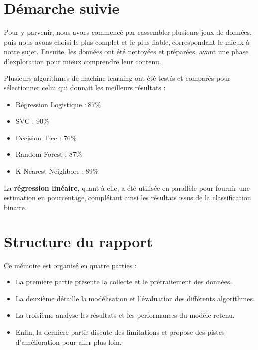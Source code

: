 \section{Démarche suivie}

Pour y parvenir, nous avons commencé par rassembler plusieurs jeux de données, puis nous avons choisi le plus complet et le plus fiable, correspondant le mieux à notre sujet. Ensuite, les données ont été nettoyées et préparées, avant une phase d’exploration pour mieux comprendre leur contenu.  

Plusieurs algorithmes de machine learning ont été testés et comparés pour sélectionner celui qui donnait les meilleurs résultats :  
\begin{itemize}
	\item Régression Logistique : 87\%  
	\item SVC : 90\%  
	\item Decision Tree : 76\%  
	\item Random Forest : 87\%  
	\item K-Nearest Neighbors : 89\%  
\end{itemize}  

La \textbf{régression linéaire}, quant à elle, a été utilisée en parallèle pour fournir une estimation en pourcentage, complétant ainsi les résultats issus de la classification binaire.

\section{Structure du rapport}

Ce mémoire est organisé en quatre parties : 
\begin{itemize}
	\item La première partie présente la collecte et le prétraitement des données.
	\item La deuxième détaille la modélisation et l’évaluation des différents algorithmes.
	\item La troisième analyse les résultats et les performances du modèle retenu.
	\item Enfin, la dernière partie discute des limitations et propose des pistes d’amélioration pour aller plus loin.
\end{itemize}
